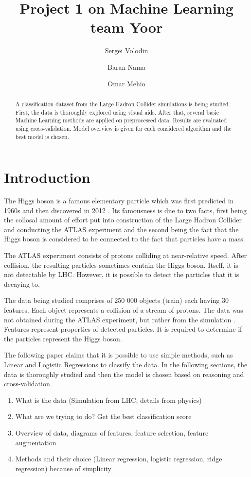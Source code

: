 \documentclass[10pt,conference,compsocconf]{IEEEtran}
\title{Project 1 on Machine Learning team Yoor}
\author[1]{Sergei Volodin}
\author[1]{Baran Nama}
\author[1]{Omar Mehio}
\affil[1]{EPFL}
\affil[ ]{\textit {\{sergei.volodin,baran.nama,omar.mehio\}@epfl.ch}}
\begin{document}
\maketitle

\begin{abstract}
A classification dataset from the Large Hadron Collider simulations is being studied. First, the data is thoroughly explored using visual aids.
After that, several basic Machine Learning methods are applied on preprocessed data.
Results are evaluated using cross-validation.
Model overview is given for each considered algorithm and the best model is chosen.
\end{abstract}

\section{Introduction}
The Higgs boson is a famous elementary particle which was first predicted in 1960s and then discovered in 2012 \cite{higgs}. Its famousness is due to two facts, first being the collosal amount of effort put into construction of the Large Hadron Collider and conducting the ATLAS experiment and the second being the fact that the Higgs boson is considered to be connected to the fact that particles have a mass.

The ATLAS experiment consists of protons colliding at near-relative speed. After collision, the resulting particles sometimes contain the Higgs boson. Itself, it is not detectable by LHC. However, it is possible to detect the particles that it is decaying to.

The data being studied comprises of 250 000 objects (train) each having 30 features. Each object represents a collision of a stream of protons. The data was not obtained during the ATLAS experiment, but rather from the simulation \cite{data}. Features represent properties of detected particles. It is required to determine if the particles represent the Higgs boson.

The following paper claims that it is possible to use simple methods, such as Linear and Logistic Regressions to classify the data. In the following sections, the data is thoroughly studied and then the model is chosen based on reasoning and cross-validation.
\begin{enumerate}
	\item What is the data (Simulation from LHC, details from physics)
	\item What are we trying to do? Get the best classification score
	\item Overview of data, diagrams of features, feature selection, feature augmentation
	\item Methods and their choice (Linear regression, logistic regression, ridge regression) because of simplicity
\end{enumerate}
\end{document}

